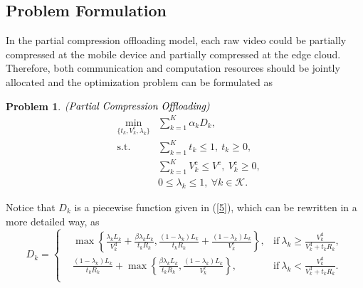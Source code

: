\documentclass[journal,draftcls,onecolumn,12pt,twoside]{IEEEtran}
\newtheorem{prob}{Problem}
\begin{document}
\subsection{Problem Formulation}
In the partial compression offloading model, each raw video could be partially compressed at the mobile device and partially compressed at the edge cloud. Therefore, both communication and computation resources should be jointly allocated and the optimization problem can be formulated as
\begin{prob}$\emph{(Partial~Compression~Offloading)}$
    \begin{subequations}
    \begin{eqnarray}
    &\min\limits_{\{t_k,V_k^{\text{c}},\lambda_k\}}&\sum_{k=1}^K \alpha_k D_k,\label{eq:P3.a}\\
    &{\text{s.t.}}&\sum_{k=1}^K t_k \le 1,~t_k \ge 0, \label{eq:P3.b}\\
    &&\sum_{k=1}^K V_k^{\text{c}} \le V^{\text{c}},~V_k^{\text{c}} \ge 0,\label{eq:P3.c}\\
    &&0 \le \lambda_k\le 1,~\forall k \in \mathcal{K}. \label{eq:P3.d}
    \end{eqnarray}
    \end{subequations}
\end{prob}
Notice that $D_k$ is a piecewise function given in (\ref{5}), which can be rewritten in a more detailed way, as
\begin{equation}
	D_k =
    \left\{
    \begin{aligned}
        &\max \left \{ \frac{\lambda_k L_k}{V_k^{\text{d}}} + \frac{\beta \lambda_k L_k}{t_k R_k},\frac{(1-\lambda_k)L_k}{t_kR_k} + \frac{(1-\lambda_k)L_k}{V_k^{\text{c}}} \right\},
            &\text{if}~\lambda_k \ge \frac{V_k^{\text{d}}}{V_k^{\text{d}} + t_k R_k},\\
        &\frac{(1-\lambda_k)L_k}{t_k R_k}+\max \left\{\frac{\beta \lambda_k L_k}{t_k R_k},\frac{(1-\lambda_k)L_k}{V_k^{\text{c}}} \right\} ,
            &\text{if}~\lambda_k<\frac{V_k^{\text{d}}}{V_k^{\text{d}}+t_k R_k}.\\
	\end{aligned}
    \right. \label{21}
\end{equation}
\end{document}
